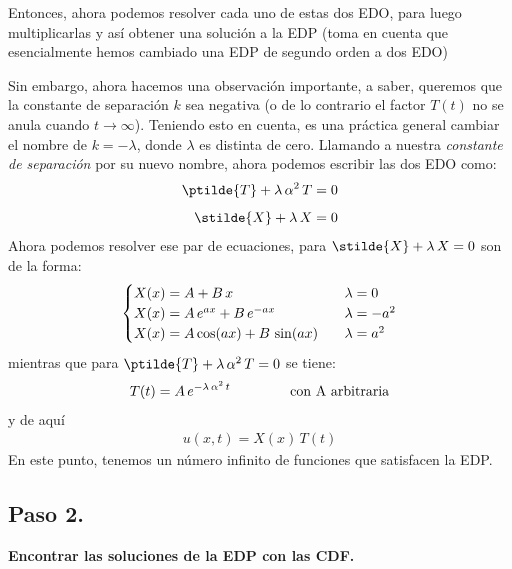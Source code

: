 Entonces, ahora podemos resolver cada uno de estas dos EDO, para luego multiplicarlas y así obtener una solución a la EDP (toma en cuenta que esencialmente hemos cambiado una EDP de segundo orden a dos EDO)
\par
Sin embargo, ahora hacemos una observación importante, a saber, queremos que la constante de separación $k$ sea negativa (o de lo contrario el factor $T (t)$ no se anula cuando $t \to \infty$). Teniendo esto en cuenta, es una práctica general cambiar el nombre de $k = - \lambda$, donde $\lambda$ es distinta de cero. Llamando a nuestra \emph{constante de separación} por su nuevo nombre, ahora podemos escribir las dos EDO como:
\begin{align*}
\ptilde{T} + \lambda \, \alpha^{2} \, T &= 0 \\[0.5em]
\stilde{X} + \lambda \, X &= 0
\end{align*}
Ahora podemos resolver ese par de ecuaciones, para $\stilde{X} + \lambda \, X = 0$ son de la forma:
\begin{align}
\begin{cases}
X(x) = A + B \, x & \hspace{0.2cm} \lambda = 0 \\
X(x) = A \, e^{a x} + B \, e^{-a x} & \hspace{0.2cm} \lambda = - a^{2} \\
X(x) = A \cos (a x ) + B \, \sin (a x) & \hspace{0.2cm} \lambda = a^{2}
\end{cases}
\label{eq:ecuacion_06_02_31}
\end{align}
mientras que para $\ptilde{T} + \lambda \, \alpha^{2} \, T = 0$ se tiene:
\begin{align}
T(t) = A \, e^{- \lambda \, \alpha^{2} \, t} \hspace{1.5cm} \mbox{con A arbitraria}
\label{eq:ecuacion_06_02_36a}    
\end{align}
y de aquí
\begin{align*}
u(x, t) = X(x) \, T(t) 
\end{align*}
En este punto, tenemos un número infinito de funciones que satisfacen la EDP.

\subsection{Paso 2.}

\textbf{Encontrar las soluciones de la EDP con las CDF.}

